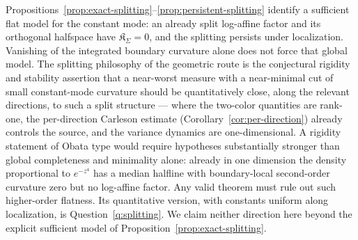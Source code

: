 \documentclass[../../main.tex]{subfiles}
\begin{document}
\begin{remark}
\label{rem:obata}
Propositions~\ref{prop:exact-splitting}--\ref{prop:persistent-splitting} identify a sufficient
flat model for the constant mode: an already split log-affine factor and its orthogonal
halfspace have $\mathfrak K_\Sigma=0$, and the splitting persists under localization. Vanishing
of the integrated boundary curvature alone does not force that global model. The splitting
philosophy of the geometric route is the conjectural rigidity and stability assertion that a
near-worst measure with a near-minimal cut of small constant-mode curvature should be
quantitatively close, along the relevant directions, to such a split structure --- where the
two-color quantities are rank-one, the per-direction Carleson estimate
(Corollary~\ref{cor:per-direction}) already controls the source, and the variance dynamics are
one-dimensional. A rigidity statement of Obata type would require hypotheses substantially
stronger than global completeness and minimality alone: already in one dimension the density
proportional to $e^{-z^4}$ has a median halfline with boundary-local second-order curvature zero
but no log-affine factor. Any valid theorem must rule out such higher-order flatness. Its
quantitative version, with constants uniform along localization, is
Question~\ref{q:splitting}. We claim neither direction here beyond the explicit sufficient model
of Proposition~\ref{prop:exact-splitting}.
\end{remark}
\end{document}

